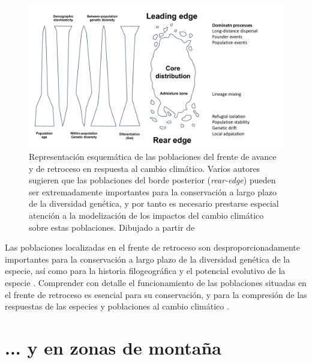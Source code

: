 \begin{figure}
	\centering
	\includegraphics[width=\textwidth]{img/intro/intro-rearedge.pdf} \caption{Representación esquemática de las poblaciones del frente de avance y de retroceso en respuesta al cambio climático. Varios autores sugieren que las poblaciones del borde posterior (\emph{rear-edge}) pueden ser extremadamente importantes para la conservación a largo plazo de la diversidad genética, y por tanto es necesario prestarse especial atención a la modelización de los impactos del cambio climático sobre estas poblaciones. Dibujado a partir de \autocites{HampePetit2005ConservingBiodiversity,Woolbrightetal2014ClimateRelicts,WillisBirks2006WhatNatural}}\label{fig:intro:rear}
\end{figure}

Las poblaciones localizadas en el frente de retroceso \autocite[\textit{rear-edge, sensu}][]{HampePetit2005ConservingBiodiversity} son desproporcionadamente importantes para la conservación a largo plazo de la diversidad genética de la especie, así como para la historia filogeográfica y el potencial evolutivo de la especie \autocites{HampePetit2005ConservingBiodiversity,Woolbrightetal2014ClimateRelicts,WillisBirks2006WhatNatural}. Comprender con detalle el funcionamiento de las poblaciones situadas en el frente de retroceso es esencial para su conservación, y para la compresión de las respuestas de las especies y poblaciones al cambio climático \autocite{Jumpetal2010MonitoringManaging, HampeJump2011ClimateRelicts, Fadyetal2016EvolutionbasedApproach}. 

\section{... y en zonas de montaña}\label{sec:intro:montana}

